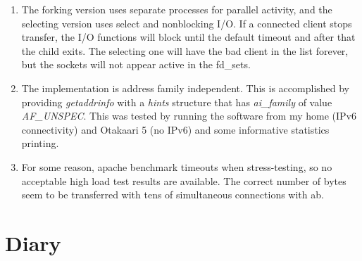 \documentclass[a4paper,12pt]{article}
\begin{document}
\begin{enumerate}
\item The forking version uses separate processes for parallel activity, and the selecting version uses select and nonblocking I/O. If a connected client stops transfer, the I/O functions will block until the default timeout and after that the child exits. The selecting one will have the bad client in the list forever, but the sockets will not appear active in the fd\_sets.
\item The implementation is address family independent. This is accomplished by providing \emph{getaddrinfo} with a \emph{hints} structure that has \emph{ai\_family} of value \emph{AF\_UNSPEC}. This was tested by running the software from my home (IPv6 connectivity) and Otakaari 5 (no IPv6) and some informative statistics printing.
\item For some reason, apache benchmark timeouts when stress-testing, so no acceptable high load test results are available. The correct number of bytes seem to be transferred with tens of simultaneous connections with ab.
\end{enumerate}

\section{Diary}
\end{document}
